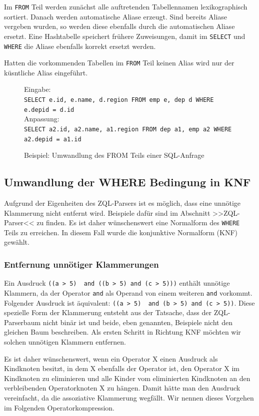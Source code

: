 Im \verb|FROM| Teil werden zunächst alle auftretenden Tabellennamen lexikographisch sortiert. Danach werden automatische Aliase erzeugt. Sind bereits Aliase vergeben wurden, so werden diese ebenfalls durch die automatischen Aliase ersetzt. Eine Hashtabelle speichert frühere Zuweisungen, damit im \verb|SELECT| und \verb|WHERE| die Aliase ebenfalls korrekt ersetzt werden.

Hatten die vorkommenden Tabellen im \verb|FROM| Teil keinen Alias wird nur der küsntliche Alias eingeführt.

\begin{figure}
Eingabe: \\\verb|SELECT e.id, e.name, d.region FROM emp e, dep d WHERE e.depid = d.id|\\

Anpassung: \\\verb|SELECT a2.id, a2.name, a1.region FROM dep a1, emp a2 WHERE a2.depid = a1.id|\\
\caption{Beispiel: Umwandlung des FROM Teils einer SQL-Anfrage}
\end{figure}

\subsection{Umwandlung der WHERE Bedingung in KNF}

Aufgrund der Eigenheiten des ZQL-Parsers ist es möglich, dass eine unnötige Klammerung nicht entfernt wird. Beispiele dafür sind im Abschnitt >>ZQL-Parser<< zu finden. Es ist daher wünschenswert eine Normalform des \verb|WHERE| Teils zu erreichen. In diesem Fall wurde die konjunktive Normalform (KNF) gewählt.


\subsubsection{Entfernung unnötiger Klammerungen}

Ein Ausdruck \verb|((a > 5)  and ((b > 5) and (c > 5)))| enthält unnötige Klammern, da der Operator \verb|and| als Operand von einem weiteren \verb|and| vorkommt. Folgender Ausdruck ist äquivalent: \verb|((a > 5)  and (b > 5) and (c > 5))|. Diese spezielle Form der Klammerung entsteht aus der Tatsache, dass der ZQL-Parserbaum nicht binär ist und beide,  eben genannten, Beispiele nicht den gleichen Baum beschreiben. Als ersten Schritt in Richtung KNF möchten wir solchen unnötigen Klammern entfernen. 

Es ist daher wünschenswert, wenn ein Operator X einen Ausdruck als Kindknoten besitzt, in dem X ebenfalls der Operator ist, den Operator X im Kindknoten zu eliminieren und alle Kinder vom eliminierten Kindknoten an den verbleibenden Operatorknoten X zu hängen. Damit hätte man den Ausdruck vereinfacht, da die assoziative Klammerung wegfällt. Wir nennen dieses Vorgehen im Folgenden Operatorkompression.

